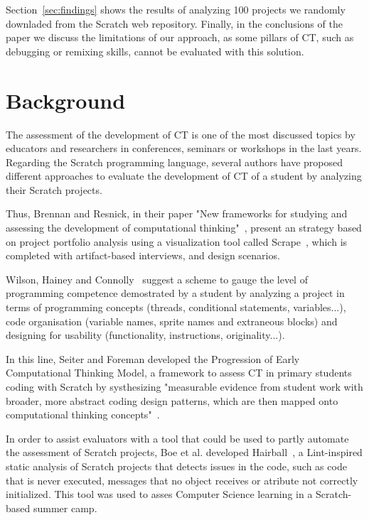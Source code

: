 \documentclass[a4paper,11pt]{article}
\begin{document}
Section~\ref{sec:findings} shows the results of analyzing 100 projects we randomly downladed from the Scratch web repository. Finally, in the conclusions of the paper we discuss the limitations of our approach, as some pillars of CT, such as debugging or remixing skills, cannot be evaluated with this solution.


\section{Background}
\label{sec:background}
The assessment of the development of CT is one of the most discussed topics by educators and researchers in conferences, seminars or workshops in the last years. Regarding the Scratch programming language, several authors have proposed different approaches to evaluate the development of CT of a student by analyzing their Scratch projects. 

Thus, Brennan and Resnick, in their paper "New frameworks for studying and assessing the development of computational thinking"~\cite{brennan2012new}, present an strategy based on project portfolio analysis using a visualization tool called Scrape~\cite{wolz2011scrape}, which is completed with artifact-based interviews, and design scenarios.

Wilson, Hainey and Connolly~\cite{wilson2012evaluation} suggest a scheme to gauge the level of programming competence demostrated by a student by analyzing a project in terms of programming concepts (threads, conditional statements, variables...), code organisation (variable names, sprite names and extraneous blocks) and designing for usability (functionality, instructions, originality...).

In this line, Seiter and Foreman developed the Progression of Early Computational Thinking Model, a framework to assess CT in primary students coding with Scratch by systhesizing "measurable evidence from student work with broader, more abstract coding design patterns, which are then mapped onto computational thinking concepts"~\cite{seiter2013modeling}.

In order to assist evaluators with a tool that could be used to partly automate the assessment of Scratch projects, Boe et al. developed Hairball~\cite{boe2013hairball}, a Lint-inspired static analysis of Scratch projects that detects issues in the code, such as code that is never executed, messages that no object receives or atribute not correctly initialized. This tool was used to asses Computer Science learning in a Scratch-based summer camp\cite{franklin2013assessment}. 
\end{document}
